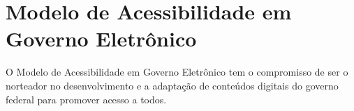 \chapter[Modelo de Acessibilidade em Governo Eletrônico]{Modelo de Acessibilidade em Governo Eletrônico}

O Modelo de Acessibilidade em Governo Eletrônico tem o compromisso de ser o norteador no desenvolvimento e a adaptação de conteúdos digitais do governo federal para promover acesso a todos.
